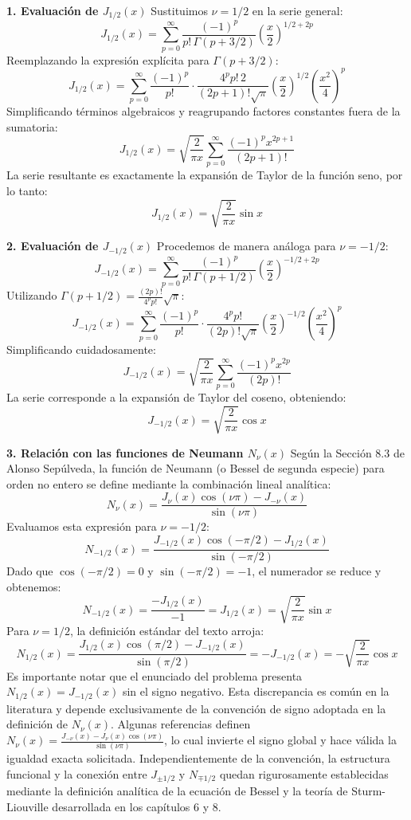 \documentclass[a4paper]{article}
\begin{document}
\textbf{1. Evaluación de $J_{1/2}(x)$}
Sustituimos $\nu = 1/2$ en la serie general:
$$J_{1/2}(x) = \sum_{p=0}^{\infty} \frac{(-1)^p}{p! \, \Gamma(p + 3/2)} \left(\frac{x}{2}\right)^{1/2 + 2p}$$
Reemplazando la expresión explícita para $\Gamma(p + 3/2)$:
$$J_{1/2}(x) = \sum_{p=0}^{\infty} \frac{(-1)^p}{p!} \cdot \frac{4^p p! \, 2}{(2p+1)! \sqrt{\pi}} \left(\frac{x}{2}\right)^{1/2} \left(\frac{x^2}{4}\right)^p$$
Simplificando términos algebraicos y reagrupando factores constantes fuera de la sumatoria:
$$J_{1/2}(x) = \sqrt{\frac{2}{\pi x}} \sum_{p=0}^{\infty} \frac{(-1)^p x^{2p+1}}{(2p+1)!}$$
La serie resultante es exactamente la expansión de Taylor de la función seno, por lo tanto:
$$J_{1/2}(x) = \sqrt{\frac{2}{\pi x}} \sin x$$

\textbf{2. Evaluación de $J_{-1/2}(x)$}
Procedemos de manera análoga para $\nu = -1/2$:
$$J_{-1/2}(x) = \sum_{p=0}^{\infty} \frac{(-1)^p}{p! \, \Gamma(p + 1/2)} \left(\frac{x}{2}\right)^{-1/2 + 2p}$$
Utilizando $\Gamma(p + 1/2) = \frac{(2p)!}{4^p p!} \sqrt{\pi}$:
$$J_{-1/2}(x) = \sum_{p=0}^{\infty} \frac{(-1)^p}{p!} \cdot \frac{4^p p!}{(2p)! \sqrt{\pi}} \left(\frac{x}{2}\right)^{-1/2} \left(\frac{x^2}{4}\right)^p$$
Simplificando cuidadosamente:
$$J_{-1/2}(x) = \sqrt{\frac{2}{\pi x}} \sum_{p=0}^{\infty} \frac{(-1)^p x^{2p}}{(2p)!}$$
La serie corresponde a la expansión de Taylor del coseno, obteniendo:
$$J_{-1/2}(x) = \sqrt{\frac{2}{\pi x}} \cos x$$

\textbf{3. Relación con las funciones de Neumann $N_\nu(x)$}
Según la Sección 8.3 de Alonso Sepúlveda, la función de Neumann (o Bessel de segunda especie) para orden no entero se define mediante la combinación lineal analítica:
$$N_\nu(x) = \frac{J_\nu(x) \cos(\nu\pi) - J_{-\nu}(x)}{\sin(\nu\pi)}$$
Evaluamos esta expresión para $\nu = -1/2$:
$$N_{-1/2}(x) = \frac{J_{-1/2}(x) \cos(-\pi/2) - J_{1/2}(x)}{\sin(-\pi/2)}$$
Dado que $\cos(-\pi/2) = 0$ y $\sin(-\pi/2) = -1$, el numerador se reduce y obtenemos:
$$N_{-1/2}(x) = \frac{- J_{1/2}(x)}{-1} = J_{1/2}(x) = \sqrt{\frac{2}{\pi x}} \sin x$$
Para $\nu = 1/2$, la definición estándar del texto arroja:
$$N_{1/2}(x) = \frac{J_{1/2}(x) \cos(\pi/2) - J_{-1/2}(x)}{\sin(\pi/2)} = -J_{-1/2}(x) = -\sqrt{\frac{2}{\pi x}} \cos x$$
Es importante notar que el enunciado del problema presenta $N_{1/2}(x) = J_{-1/2}(x)$ sin el signo negativo. Esta discrepancia es común en la literatura y depende exclusivamente de la convención de signo adoptada en la definición de $N_\nu(x)$. Algunas referencias definen $N_\nu(x) = \frac{J_{-\nu}(x) - J_\nu(x)\cos(\nu\pi)}{\sin(\nu\pi)}$, lo cual invierte el signo global y hace válida la igualdad exacta solicitada. Independientemente de la convención, la estructura funcional y la conexión entre $J_{\pm 1/2}$ y $N_{\mp 1/2}$ quedan rigurosamente establecidas mediante la definición analítica de la ecuación de Bessel y la teoría de Sturm-Liouville desarrollada en los capítulos 6 y 8.
\end{document}
